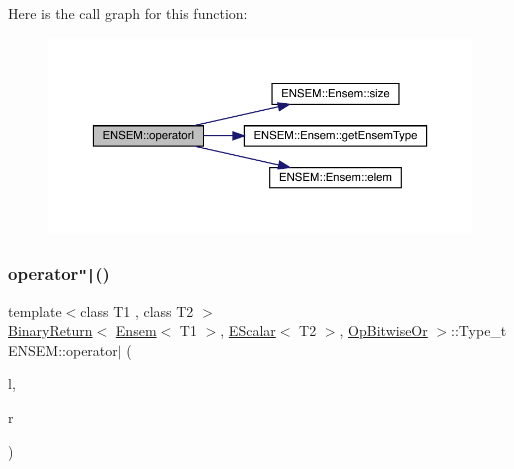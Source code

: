 Here is the call graph for this function\+:\nopagebreak
\begin{figure}[H]
\begin{center}
\leavevmode
\includegraphics[width=350pt]{d1/d9e/group__eensem_ga535dbb02f2bee6036e22a754b7144be1_cgraph}
\end{center}
\end{figure}
\mbox{\label{group__eensem_gadd9d57d20a2060d811fba3899bcfcd73}} 
\subsubsection{\texorpdfstring{operator\texttt{"|}()}{operator|()}\hspace{0.1cm}{\footnotesize\ttfamily [2/3]}}
{\footnotesize\ttfamily template$<$class T1 , class T2 $>$ \\
\mbox{\hyperlink{structENSEM_1_1BinaryReturn}{Binary\+Return}}$<$ \mbox{\hyperlink{classENSEM_1_1Ensem}{Ensem}}$<$ T1 $>$, \mbox{\hyperlink{classENSEM_1_1EScalar}{E\+Scalar}}$<$ T2 $>$, \mbox{\hyperlink{structENSEM_1_1OpBitwiseOr}{Op\+Bitwise\+Or}} $>$\+::Type\+\_\+t E\+N\+S\+E\+M\+::operator$\vert$ (\begin{DoxyParamCaption}\item[{const \mbox{\hyperlink{classENSEM_1_1Ensem}{Ensem}}$<$ T1 $>$ \&}]{l,  }\item[{const \mbox{\hyperlink{classENSEM_1_1EScalar}{E\+Scalar}}$<$ T2 $>$ \&}]{r }\end{DoxyParamCaption})\hspace{0.3cm}{\ttfamily [inline]}}

